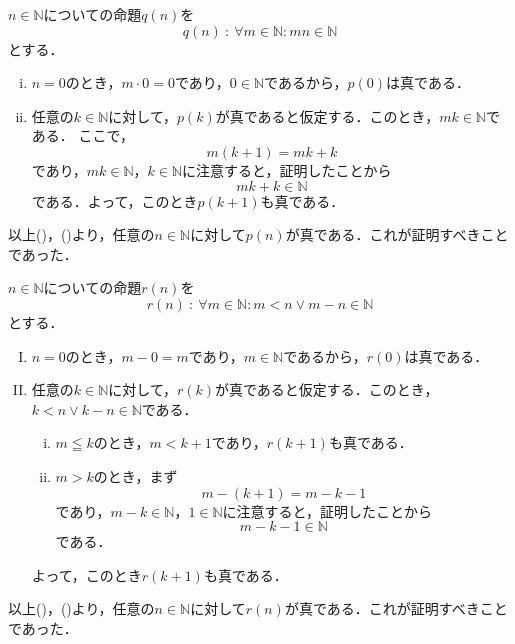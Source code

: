 
\begin{tproof}
    $n \in \mathbb{N}$についての命題$q(n)$を
    \[
        q(n) ~{:}~ \forall m \in \mathbb{N} \colon  mn \in \mathbb{N}
    \]
    とする．
    \begin{enumerate}[(i)]
        \item $n=0$のとき，$m \cdot 0=0$であり，$0 \in \mathbb{N}$であるから，$p(0)$は真である．
        \item 任意の$k \in \mathbb{N}$に対して，$p(k)$が真であると仮定する．このとき，$mk \in \mathbb{N}$である．
              ここで，
              \[
                  m(k+1)=mk + k
              \] であり，$mk \in \mathbb{N}$，$k \in \mathbb{N}$に注意すると，証明したことから
              \[
                  mk + k   \in \mathbb{N}
              \]
              である．よって，このとき$p(k+1)$も真である．
    \end{enumerate}
    以上()，()より，任意の$n \in \mathbb{N}$に対して$p(n)$が真である．これが証明すべきことであった．
\end{tproof}

\newpage


\begin{tproof}
    $n \in \mathbb{N}$についての命題$r(n)$を
    \[
        r(n) ~{:}~ \forall m \in \mathbb{N} \colon  m<n \lor m-n  \in \mathbb{N}
    \]
    とする．
    \begin{enumerate}[(I)]
        \item $n=0$のとき，$m - 0 =m$であり，$m \in \mathbb{N}$であるから，$r(0)$は真である．
        \item 任意の$k \in \mathbb{N}$に対して，$r(k)$が真であると仮定する．このとき，$k<n \lor k-n  \in \mathbb{N}$である．
              \begin{enumerate}[(i)]
                  \item $m \leqq   k$のとき，$m <k+1$であり，$r(k+1)$も真である．
                  \item $m > k$のとき，まず
                        \[
                            m-(k+1)=m-k-1
                        \] であり，$m-k \in \mathbb{N}$，$1 \in \mathbb{N}$に注意すると，証明したことから
                        \[
                            m-k-1  \in \mathbb{N}
                        \]
                        である．
              \end{enumerate}
              よって，このとき$r(k+1)$も真である．
    \end{enumerate}
    以上()，()より，任意の$n \in \mathbb{N}$に対して$r(n)$が真である．これが証明すべきことであった．
\end{tproof}

